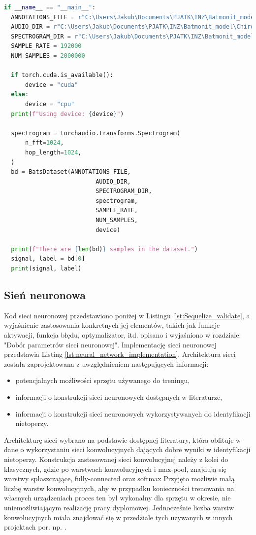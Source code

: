 \documentclass{sprz}
\begin{document}
\begin{lstlisting}[language=Python,caption={Implementacja modułu do ładowania danych}, label={lst:audio-to-spectrogram}]
  if __name__ == "__main__":
  ANNOTATIONS_FILE = r"C:\Users\Jakub\Documents\PJATK\INZ\Batmonit_model\Chiro_sounds_signed\Metadata\Annotations.csv"
  AUDIO_DIR = r"C:\Users\Jakub\Documents\PJATK\INZ\Batmonit_model\Chiro_sounds_signed\Audio"
  SPECTROGRAM_DIR = r"C:\Users\Jakub\Documents\PJATK\INZ\Batmonit_model\Chiro_sounds_signed\Spectrogram"
  SAMPLE_RATE = 192000
  NUM_SAMPLES = 2000000

  if torch.cuda.is_available():
      device = "cuda"
  else:
      device = "cpu"
  print(f"Using device: {device}")

  spectrogram = torchaudio.transforms.Spectrogram(
      n_fft=1024,
      hop_length=1024,
  )
  bd = BatsDataset(ANNOTATIONS_FILE,
                          AUDIO_DIR,
                          SPECTROGRAM_DIR, 
                          spectrogram, 
                          SAMPLE_RATE,
                          NUM_SAMPLES,
                          device)

  print(f"There are {len(bd)} samples in the dataset.")
  signal, label = bd[0]
  print(signal, label)
\end{lstlisting}

\subsection{Sień neuronowa}
Kod sieci neuronowej przedstawiono poniżej w Listingu \ref{lst:Sequelize_validate}, a wyjaśnienie zastosowania konkretnych jej elementów, takich jak funkcje aktywacji, funkcja błędu, optymalizator, itd. opisano i wyjaśniono w rozdziale: "Dobór parametrów sieci neuronowej". Implementację sieci neuronowej przedstawia Listing \ref{lst:neural_network_implementation}.
Architektura sieci została zaprojektowana z uwzględnieniem następujących informacji:
\begin{itemize}
  \item{potencjalnych możliwości sprzętu używanego do treningu,}
  \item{informacji o konstrukcji sieci neuronowych dostępnych w literaturze,}
  \item{informacji o konstrukcji sieci neuronowych wykorzystywanych do identyfikacji nietoperzy.}
\end{itemize}

Architekturę sieci wybrano na podstawie dostępnej literatury, która obfituje w dane o wykorzystaniu sieci konwolucyjnych dających dobre wyniki w identyfikacji nietoperzy. Konstrukcja zastosowanej sieci konwolucyjnej należy z kolei do klasycznych, gdzie po warstwach konwolucyjnych i max-pool, znajdują się warstwy spłaszczające, fully-connected oraz softmax \cite{obuchowski}
Przyjęto możliwie małą liczbę warstw konwolucyjnych, aby w przypadku konieczności trenowania na własnych urządzeniach proces ten był wykonalny dla sprzętu w okresie, nie uniemożliwiającym realizację pracy dyplomowej. Jednocześnie liczba warstw konwolucyjnych miała znajdować się w przedziale tych używanych w innych projektach por. np. \cite{bats-id-randomforest}. 
\end{document}
